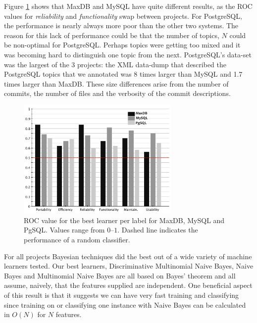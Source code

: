 \documentclass[smallextended]{svjour3}       %
\begin{document}
Figure \ref{fig:best-learn-per-tag} shows that MaxDB and MySQL have
quite different results, as the ROC values for \emph{reliability} and
\emph{functionality} swap between projects. For PostgreSQL, the
performance is nearly always more poor than the other two systems. The
reason for this lack of performance could be that the number of
topics, $N$ could be non-optimal for PostgreSQL. Perhaps topics were
getting too mixed and it was becoming hard to distinguish one topic
from the next. PostgreSQL's data-set was the largest of the 3 projects:
the XML data-dump that described the PostgreSQL topics that we
annotated was 8 times larger than MySQL and 1.7 times larger than MaxDB. These
size differences arise from the number of commits, the number of files
and the verbosity of the commit descriptions.


\begin{figure}[t]
\centering
\includegraphics[width=0.7\textwidth]{figures/both-supervised}
\caption[]{ROC value for the best learner per label for MaxDB, MySQL and PgSQL. Values range from $0$--$1$.  Dashed line indicates the performance of a random
classifier.
}
\label{fig:best-learn-per-tag}
\end{figure}

For all projects Bayesian techniques did the best out of a wide variety of machine learners tested. 
Our best learners, Discriminative Multinomial Naive Bayes, Naive Bayes
and Multinomial Naive Bayes  are all based on Bayes' theorem and all
assume, naively, that the features supplied are independent. 
One beneficial aspect of this result is that it suggests we can have
very fast training and classifying  since training on or classifying one
instance with Naive Bayes can be calculated in $O(N)$
for $N$ features.
\end{document}
